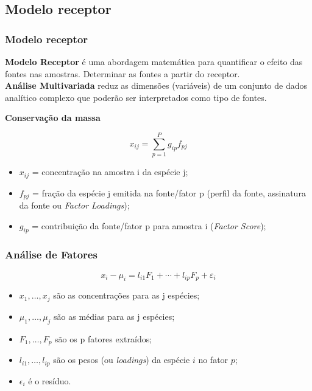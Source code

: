 \subsection{Modelo receptor}
\begin{frame}
  \frametitle{Modelo receptor}
  \textbf{Modelo Receptor} é uma abordagem matemática para quantificar o efeito das fontes 
  nas amostras. Determinar as fontes a partir do receptor. \\
  \textbf{Análise Multivariada} reduz as dimensões (variáveis) de um conjunto de dados 
   analítico complexo que poderão ser interpretados como tipo de fontes. 
   \begin{center}
   	\textbf{Conservação da massa}
   \end{center}
     \begin{equation*}
     x_{ij} = \sum_{p=1}^{P} g_{ip}f_{pj} %
     \end{equation*} 
     \begin{footnotesize}
    
     \begin{itemize}
     	\item $x_{ij}$ = concentração na amostra i da espécie j;
     	\item $f_{pj}$ = fração da espécie j emitida na fonte/fator p 
     	(perfil da fonte, assinatura da fonte ou \textit{Factor Loadings}); 
     	\item $g_{ip}$ = contribuição da fonte/fator p para amostra i (\textit{Factor Score});
     \end{itemize}
         \end{footnotesize}
\end{frame}

\begin{frame}
  \frametitle{Análise de Fatores}
\begin{equation*}
\label{eq:af}
x_i-\mu_i = l_{i1} F_1 + \cdots + l_{ip} F_p + \varepsilon_i 
\end{equation*}
  \begin{itemize}
  	\item $x_1,\dots,x_j$ são as concentrações para as j espécies;
    \item  $\mu_1,\dots,\mu_j$ são as médias para as j espécies;
    \item $F_1, \dots, F_p$ são os p fatores extraídos;
    \item $l_{i1}, \dots, l_{ip}$ são os pesos (ou \textit{loadings}) da espécie $i$ no fator $p$;
    \item $\epsilon_{i}$ é o resíduo.
   \end{itemize}
\end{frame}

